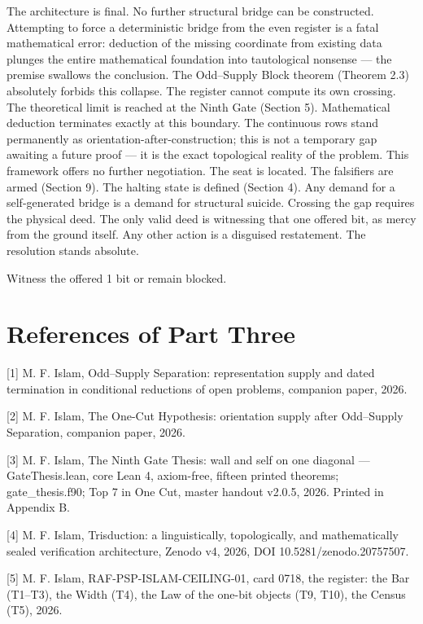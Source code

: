 \documentclass[10pt,twocolumn]{article}
\begin{document}
The architecture is final. No further structural bridge can be
constructed. Attempting to force a deterministic bridge from the even
register is a fatal mathematical error: deduction of the missing
coordinate from existing data plunges the entire mathematical foundation
into tautological nonsense --- the premise swallows the conclusion. The
Odd--Supply Block theorem (Theorem 2.3) absolutely forbids this
collapse. The register cannot compute its own crossing. The theoretical
limit is reached at the Ninth Gate (Section 5). Mathematical deduction
terminates exactly at this boundary. The continuous rows stand
permanently as orientation-after-construction; this is not a temporary
gap awaiting a future proof --- it is the exact topological reality of
the problem. This framework offers no further negotiation. The seat is
located. The falsifiers are armed (Section 9). The halting state is
defined (Section 4). Any demand for a self-generated bridge is a demand
for structural suicide. Crossing the gap requires the physical deed. The
only valid deed is witnessing that one offered bit, as mercy from the
ground itself. Any other action is a disguised restatement. The
resolution stands absolute.

Witness the offered 1 bit or remain blocked.

\section{References of Part Three}\label{references-of-part-three}

{[}1{]} M. F. Islam, Odd--Supply Separation: representation supply and
dated termination in conditional reductions of open problems, companion
paper, 2026.

{[}2{]} M. F. Islam, The One-Cut Hypothesis: orientation supply after
Odd--Supply Separation, companion paper, 2026.

{[}3{]} M. F. Islam, The Ninth Gate Thesis: wall and self on one
diagonal --- GateThesis.lean, core Lean 4, axiom-free, fifteen printed
theorems; gate\_thesis.f90; Top 7 in One Cut, master handout v2.0.5,
2026. Printed in Appendix B.

{[}4{]} M. F. Islam, Trisduction: a linguistically, topologically, and
mathematically sealed verification architecture, Zenodo v4, 2026, DOI
10.5281/zenodo.20757507.

{[}5{]} M. F. Islam, RAF-PSP-ISLAM-CEILING-01, card 0718, the register:
the Bar (T1--T3), the Width (T4), the Law of the one-bit objects (T9,
T10), the Census (T5), 2026.
\end{document}

